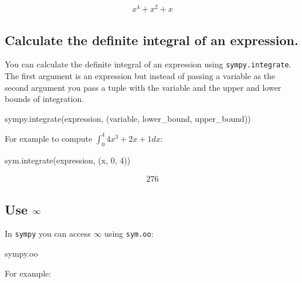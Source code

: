 \begin{equation*}
\begin{split}\displaystyle x^{4} + x^{2} + x\end{split}
\end{equation*}




\subsection{Calculate the definite integral of an expression.}
\label{\detokenize{tools-for-mathematics/03-calculus/how/main:calculate-the-definite-integral-of-an-expression}}

You can calculate the definite integral of an expression using
\texttt{sympy.integrate}. The first argument is an expression but instead of passing a
variable as the second argument you pass a tuple with the variable and the upper
and lower bounds of integration.


\begin{api}
sympy.integrate(expression, (variable, lower_bound, upper_bound))
\end{api}



For example to compute \(\int_0^4 4x^3 + 2x + 1 dx\):




\begin{pyin}
sym.integrate(expression, (x, 0, 4))
\end{pyin}




\begin{equation*}
\begin{split}\displaystyle 276\end{split}
\end{equation*}




\subsection{Use \(\infty\protect\)}
\label{\detokenize{tools-for-mathematics/03-calculus/how/main:use-infty}}

In \texttt{sympy} you can access \(\infty\) using \texttt{sym.oo}:


\begin{api}
sympy.oo
\end{api}



For example:





